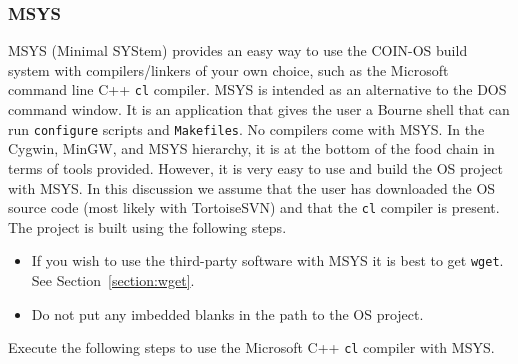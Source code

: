 \documentclass[11pt]{article}
\renewcommand{\_}{{\char"5F}}
\renewcommand{\{}{{\char"7B}}
\renewcommand{\}}{{\char"7D}}
\renewcommand{\^}{{\char"0D}}
\renewcommand{\'}{{\char"0D}}
\begin{document}
\subsubsection{MSYS} \label{section:msys}

%
MSYS (Minimal SYStem) provides an easy way to use the COIN-OS build system with compilers/linkers of your own choice,
such as the Microsoft command line C++ {\tt cl} compiler.  MSYS is intended as an alternative to the DOS command window.
It is an application that gives the user a Bourne shell that can run {\tt configure}  scripts and {\tt Makefiles}.
No compilers come with MSYS.
In the Cygwin, MinGW, and MSYS hierarchy, it is at the bottom of the food chain in terms of tools provided.
However, it is very easy to use and build the OS project with MSYS.    In this discussion we assume that the user
has downloaded the OS source code (most likely  with TortoiseSVN) 
and that the {\tt cl} compiler is present.
The project is built using the following steps.

\vskip 8pt


\begin{itemize}

\item If you wish to use the third-party software with MSYS it is best to get {\tt wget}.
See Section~\ref{section:wget}.

 \item Do not put any imbedded blanks in the path to the OS project.
\end{itemize}



Execute the following steps to use the Microsoft C++ {\tt cl} compiler with MSYS.
\end{document}
